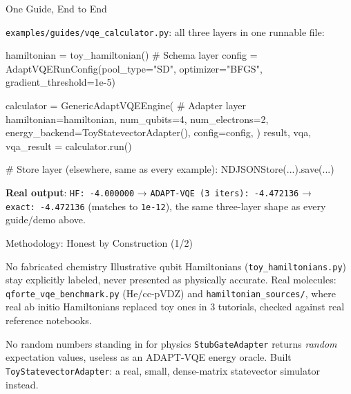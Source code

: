 \documentclass[
  ignorenonframetext,
  aspectratio=169,
]{beamer}
\newenvironment{Shaded}{\begin{snugshade}}{\end{snugshade}}
\newcommand{\CommentTok}[1]{\textcolor[rgb]{0.48,0.49,0.49}{#1}}
\newcommand{\DecValTok}[1]{\textcolor[rgb]{0.96,0.45,0.00}{#1}}
\newcommand{\FloatTok}[1]{\textcolor[rgb]{0.96,0.45,0.00}{#1}}
\newcommand{\NormalTok}[1]{\textcolor[rgb]{0.81,0.81,0.76}{#1}}
\newcommand{\OperatorTok}[1]{\textcolor[rgb]{0.81,0.81,0.76}{#1}}
\newcommand{\StringTok}[1]{\textcolor[rgb]{0.96,0.31,0.31}{#1}}
\begin{document}
\begin{frame}[fragile]{One Guide, End to End}
\label{one-guide-end-to-end}
\scriptsize

\texttt{examples/guides/vqe\_calculator.py}: all three layers in one
runnable file:

\begin{Shaded}
\begin{Highlighting}[]
\NormalTok{hamiltonian }\OperatorTok{=}\NormalTok{ toy\_hamiltonian()                              }\CommentTok{\# Schema layer}
\NormalTok{config }\OperatorTok{=}\NormalTok{ AdaptVQERunConfig(pool\_type}\OperatorTok{=}\StringTok{"SD"}\NormalTok{, optimizer}\OperatorTok{=}\StringTok{"BFGS"}\NormalTok{, gradient\_threshold}\OperatorTok{=}\FloatTok{1e{-}5}\NormalTok{)}

\NormalTok{calculator }\OperatorTok{=}\NormalTok{ GenericAdaptVQEEngine(                           }\CommentTok{\# Adapter layer}
\NormalTok{    hamiltonian}\OperatorTok{=}\NormalTok{hamiltonian, num\_qubits}\OperatorTok{=}\DecValTok{4}\NormalTok{, num\_electrons}\OperatorTok{=}\DecValTok{2}\NormalTok{,}
\NormalTok{    energy\_backend}\OperatorTok{=}\NormalTok{ToyStatevectorAdapter(), config}\OperatorTok{=}\NormalTok{config,}
\NormalTok{)}
\NormalTok{result, vqa, vqa\_result }\OperatorTok{=}\NormalTok{ calculator.run()}

\CommentTok{\# Store layer (elsewhere, same as every example): NDJSONStore(...).save(...)}
\end{Highlighting}
\end{Shaded}

\textbf{Real output}: \texttt{HF:\ -4.000000} →
\texttt{ADAPT-VQE\ (3\ iters):\ -4.472136} → \texttt{exact:\ -4.472136}
(matches to \texttt{1e-12}), the same three-layer shape as every
guide/demo above. \normalsize
\end{frame}

\begin{frame}{Methodology: Honest by Construction (1/2)}
\label{methodology-honest-by-construction-12}
\footnotesize
\begin{block}{No fabricated chemistry}
Illustrative qubit Hamiltonians (\texttt{toy\_hamiltonians.py}) stay explicitly labeled, never presented as physically accurate. Real molecules: \texttt{qforte\_vqe\_benchmark.py} (He/cc-pVDZ) and \texttt{hamiltonian\_sources/}, where real ab initio Hamiltonians replaced toy ones in 3 tutorials, checked against real reference notebooks.
\end{block}

\begin{block}{No random numbers standing in for physics}
\texttt{StubGateAdapter} returns \emph{random} expectation values, useless as an ADAPT-VQE energy oracle. Built \texttt{ToyStatevectorAdapter}: a real, small, dense-matrix statevector simulator instead.
\end{block}
\normalsize
\end{frame}
\end{document}
